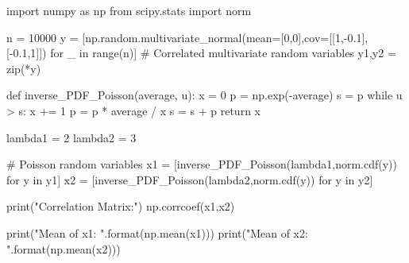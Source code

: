 import numpy as np
from scipy.stats import norm

n = 10000
y = [np.random.multivariate_normal(mean=[0,0],cov=[[1,-0.1],[-0.1,1]]) for _ in range(n)]
# Correlated multivariate random variables
y1,y2 = zip(*y)

def inverse_PDF_Poisson(average, u):
    x = 0
    p = np.exp(-average)
    s = p
    while u > s:
        x += 1
        p = p * average / x
        s = s + p
    return x  

lambda1 = 2
lambda2 = 3

# Poisson random variables
x1 = [inverse_PDF_Poisson(lambda1,norm.cdf(y)) for y in y1]
x2 = [inverse_PDF_Poisson(lambda2,norm.cdf(y)) for y in y2]

print("Correlation Matrix:")
np.corrcoef(x1,x2)

print("Mean of x1: {}".format(np.mean(x1)))
print("Mean of x2: {}".format(np.mean(x2)))